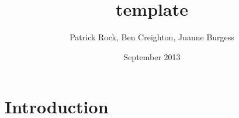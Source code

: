 \documentclass{article}
\title{template}
\author{Patrick Rock, Ben Creighton, Juaune Burgess}
\date{September 2013}
\begin{document}
\maketitle

\section{Introduction}
\end{document}
